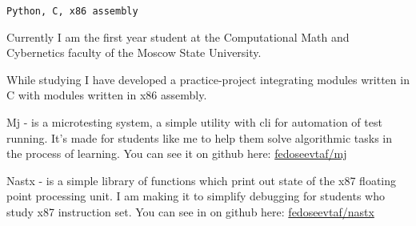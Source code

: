 


\begin{titlepage}

\BgThispage




\begin{centering}
\texttt{Python, C, x86 assembly}

\end{centering}



Currently I am the first year student at the Computational
Math and Cybernetics faculty of the Moscow State University.

While studying I have developed a practice-project integrating
modules written in C with modules written in x86 assembly.



Mj - is a microtesting system, a simple utility with cli
for automation of test running. It's made for students like
me to help them solve algorithmic tasks in the process of
learning. You can see it on github here:
\href{https://github.com/fedoseevtaf/mj}{fedoseevtaf/mj}


Nastx - is a simple library of functions which print out
state of the x87 floating point processing unit. I am making
it to simplify debugging for students who study x87
instruction set. You can see in on github here:
\href{https://github.com/fedoseevtaf/nastx}{fedoseevtaf/nastx}

\clearpage
\end{titlepage}



